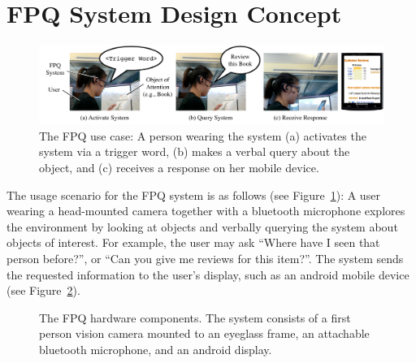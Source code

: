 \documentclass{llncs}
\begin{document}
%
\section{FPQ System Design Concept}
\begin{figure}[t]
\includegraphics[width=\linewidth]{fig/FPQ.pdf}
\caption{The FPQ use case: A person wearing the system (a) activates the system via a trigger word, (b) makes a verbal query about the object, and (c) receives a response on her mobile device.}
\label{fig:mmfps-usecase}
\end{figure}
The usage scenario for the FPQ system is as follows (see Figure~\ref{fig:mmfps-usecase}): A user wearing a head-mounted camera together with a bluetooth microphone explores the environment by looking at objects and verbally querying the system about objects of interest. For
example, the user may ask ``Where have I seen that person before?'', or ``Can you give me reviews for this item?''. The system sends the requested information to the user's display, such as an android mobile device (see Figure~\ref{fig:mmfps-hardware}). 
\begin{figure}
\caption{The FPQ hardware components. The system consists of a first person vision camera mounted to an eyeglass frame, an attachable bluetooth microphone, and an android display.}
\label{fig:mmfps-hardware}
\end{figure}
\end{document}
